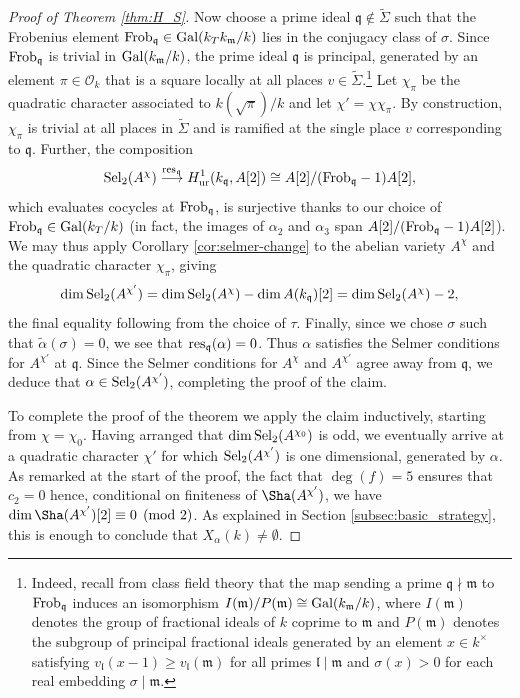 \documentclass[10pt]{amsart}
\numberwithin{equation}{section}
\theoremstyle{remark}
\theoremstyle{definition}
\theoremstyle{definition}
\theoremstyle{definition}
\theoremstyle{definition}
\theoremstyle{definition}
\theoremstyle{definition}
\theoremstyle{definition}
\theoremstyle{definition}
\begin{document}
\begin{proof}[Proof of Theorem \ref{thm:H_S}]
Now choose a prime ideal $\mathfrak{q}\notin \widetilde{\Sigma}$ such that the Frobenius element $\textup{Frob}_{\mathfrak{q}}\in \textup{Gal}(k_Tk_\mathfrak{m}/k)$ lies in the conjugacy class of $\sigma$. Since $\textup{Frob}_{\mathfrak{q}}$ is trivial in $\textup{Gal}(k_\mathfrak{m}/k)$, the prime ideal $\mathfrak{q}$ is principal, generated by an element $\pi\in \mathcal{O}_k$ that is a square locally at all places $v\in \widetilde{\Sigma}$.\footnote{Indeed, recall from class field theory that the map sending a prime $\mathfrak{q}\nmid \mathfrak{m}$  to $\textup{Frob}_{\mathfrak{q}}$ induces an  isomorphism $I(\mathfrak{m})/P(\mathfrak{m})\cong \textup{Gal}(k_\mathfrak{m}/k)$, where $I(\mathfrak{m})$ denotes the group of fractional ideals  of $k$ coprime to $\mathfrak{m}$ and $P(\mathfrak{m})$ denotes the subgroup of principal fractional ideals generated by an element $x\in k^{\times}$ satisfying $v_\mathfrak{l}(x-1)\geq  v_\mathfrak{l}(\mathfrak{m})$   for all primes $\mathfrak{l}\mid \mathfrak{m}$ and   $\sigma(x)>0$ for each real embedding $\sigma \mid \mathfrak{m}$.} Let $\chi_\pi$ be the quadratic character associated to $k(\sqrt{\pi})/k$ and let $\chi'=\chi \chi_\pi$. By construction, $\chi_{\pi}$ is trivial at all places in $\widetilde{\Sigma}$ and is ramified at the single place $v$ corresponding to $\mathfrak{q}$. Further, the composition 
\[\textup{Sel}_{2}(A^\chi)\stackrel{\textup{res}_{\mathfrak{q}}}{\longrightarrow} H^1_{\textup{ur}}(k_\mathfrak{q},A[2])\cong  A[2]/(\textup{Frob}_\mathfrak{q}-1)A[2],\]
which evaluates cocycles at $\textup{Frob}_\mathfrak{q}$, 
is surjective thanks to our choice of $\textup{Frob}_\mathfrak{q}\in \textup{Gal}(k_T/k)$ (in fact, the images of $\alpha_2$ and $\alpha_3$ span $A[2]/(\textup{Frob}_\mathfrak{q}-1)A[2]$). 
 We may thus apply Corollary \ref{cor:selmer-change} to the abelian variety $A^\chi$ and the quadratic character $\chi_\pi$,  giving 
\[\dim \textup{Sel}_2(A^{\chi'})=\dim \textup{Sel}_2(A^\chi)-\dim A(k_\mathfrak{q})[2]=\dim \textup{Sel}_2(A^\chi)-2,\]
the final equality following from the choice of $\tau$. %
Finally, since we chose $\sigma$ such that $\widetilde{\alpha}(\sigma)=0$, we see that $\textup{res}_\mathfrak{q}(\alpha)=0$. Thus $\alpha$ satisfies the Selmer conditions for $A^{\chi'}$ at $\mathfrak{q}$. Since the Selmer conditions for $A^\chi$ and $A^{\chi'}$ agree away from $\mathfrak{q}$, we deduce that $\alpha \in \textup{Sel}_2(A^{\chi'})$, completing the proof of the claim.

To complete the proof of the theorem we apply the claim inductively, starting from $\chi=\chi_0$. Having arranged that $\dim \textup{Sel}_2(A^{\chi_0})$ is odd, we eventually arrive at a quadratic character $\chi'$ for which $\textup{Sel}_2(A^{\chi'})$ is one dimensional, generated by $\alpha$. As remarked at the start of the proof, the fact that $\deg(f)=5$ ensures that $c_2=0$ hence, conditional on finiteness of $\Sha(A^{\chi'})$, we have $\dim \Sha(A^{\chi'})[2]\equiv 0 \pmod 2$.  As explained in Section \ref{subsec:basic_strategy}, this is enough to conclude that $X_{\alpha}(k)\neq \emptyset$.
 \end{proof}
 
\end{document}
